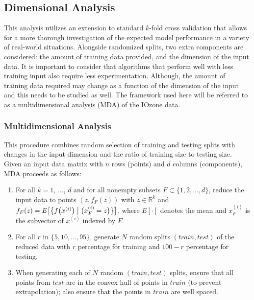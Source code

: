 \subsection{Dimensional Analysis}

This analysis utilizes an extension to standard $k$-fold cross
validation that allows for a more thorough investigation of the
expected model performance in a variety of real-world
situations. Alongside randomized splits, two extra components are
considered: the amount of training data provided, and the dimension of
the input data. It is important to consider that algorithms that
perform well with less training input also require less
experimentation. Although, the amount of training data required may
change as a function of the dimension of the input and this needs to
be studied as well. The framework used here will be referred to as a
multidimensional analysis (MDA) of the IOzone data.

\subsubsection{Multidimensional Analysis}

This procedure combines random selection of training and testing
splits with changes in the input dimension and the ratio of training
size to testing size. Given an input data matrix with $n$ rows
(points) and $d$ columns (components), MDA proceeds as follows:
\begin{enumerate}
\item For all $k = 1$, $\ldots$, $d$ and for all nonempty subsets $F
  \subset \{1, 2, \ldots, d\}$, reduce the input data to points $(z,
  f_F(z))$ with $z \in \mathbb{R}^k$ and $f_F(z) = E\bigl[ \bigl\{
    f\bigl(x^{(i)}\bigr) \bigm| \bigl(x^{(i)}_F = z\bigr) \bigr\}
    \bigr]$, where $E[\cdot]$ denotes the mean and $x^{(i)}_F$ is the
  subvector of $x^{(i)}$ indexed by $F$.
\item For all $r$ in $\{5, 10, \ldots, 95\}$, generate $N$ random
  splits $(train, test)$ of the reduced data with $r$ percentage for
  training and $100 - r$ percentage for testing.
\item When generating each of $N$ random $(train, test)$ splits,
  ensure that all points from $test$ are in the convex hull of points
  in $train$ (to prevent extrapolation); also ensure that the points
  in $train$ are well spaced.
\end{enumerate}

